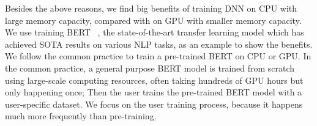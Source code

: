 \textcolor{check}{Besides the above reasons, we find big benefits of training DNN on CPU with large memory capacity, compared with on GPU with smaller memory capacity. We use training BERT~\cite{devlin2018bert}
\textcolor{check}{, the state-of-the-art transfer learning model which has achieved SOTA results on various NLP tasks,} as an example to show the benefits. We follow the common practice to %
\textcolor{check}{train} a pre-trained BERT on CPU or GPU. In the common practice, a general purpose BERT model is trained from scratch using large-scale computing resources\textcolor{check}{, often taking hundreds of GPU hours but only happening once}; Then the user %
\textcolor{check}{trains} the pre-trained BERT model with a user-specific dataset. We focus on the user \textcolor{check}{training} %
process, because it happens much more frequently than pre-training.}




